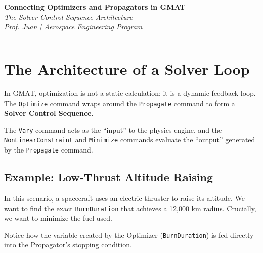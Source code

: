 \documentclass[11pt, letterpaper]{article}
\begin{document}
\begin{center}
    {\Large \textbf{Connecting Optimizers and Propagators in GMAT}} \\
    \vspace{0.2cm}
    {\large \textit{The Solver Control Sequence Architecture}} \\
    \vspace{0.4cm}
    \textit{Prof. Juan | Aerospace Engineering Program}
\end{center}
\hrule
\vspace{0.5cm}

\section*{The Architecture of a Solver Loop}

In GMAT, optimization is not a static calculation; it is a dynamic feedback loop. The \texttt{Optimize} command wraps around the \texttt{Propagate} command to form a \textbf{Solver Control Sequence}. 

The \texttt{Vary} command acts as the ``input'' to the physics engine, and the \texttt{NonLinearConstraint} and \texttt{Minimize} commands evaluate the ``output'' generated by the \texttt{Propagate} command.

\subsection*{Example: Low-Thrust Altitude Raising}

In this scenario, a spacecraft uses an electric thruster to raise its altitude. We want to find the exact \texttt{BurnDuration} that achieves a 12,000 km radius. Crucially, we want to minimize the fuel used.

Notice how the variable created by the Optimizer (\texttt{BurnDuration}) is fed directly into the Propagator's stopping condition.
\end{document}
